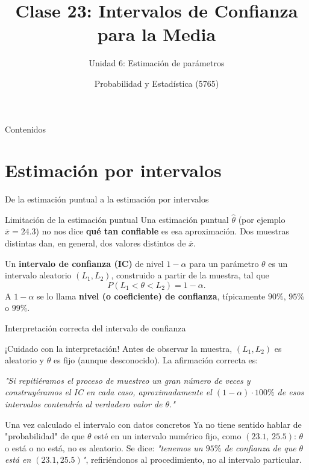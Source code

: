 \documentclass[aspectratio=169,11pt]{beamer}
\title[Prob. y Estadística]{Clase 23: Intervalos de Confianza para la Media}
\subtitle{Unidad 6: Estimación de parámetros}
\institute[UNS]{Universidad Nacional del Sur \\ Departamento de Matemática}
\author{Probabilidad y Estadística (5765)}
\date{}
\begin{document}
\begin{frame}
\titlepage
\end{frame}

\begin{frame}{Contenidos}
\tableofcontents
\end{frame}

\section{Estimación por intervalos}

\begin{frame}{De la estimación puntual a la estimación por intervalos}
\begin{block}{Limitación de la estimación puntual}
Una estimación puntual $\widehat\theta$ (por ejemplo $\overline x = 24.3$) no nos dice \textbf{qué tan confiable} es esa aproximación. Dos muestras distintas dan, en general, dos valores distintos de $\overline x$.
\end{block}

\begin{definition}
Un \textbf{intervalo de confianza (IC)} de nivel $1-\alpha$ para un parámetro $\theta$ es un intervalo aleatorio $(L_1, L_2)$, construido a partir de la muestra, tal que
\[
P(L_1 < \theta < L_2) = 1-\alpha.
\]
A $1-\alpha$ se lo llama \textbf{nivel (o coeficiente) de confianza}, típicamente $90\%$, $95\%$ o $99\%$.
\end{definition}
\end{frame}

\begin{frame}{Interpretación correcta del intervalo de confianza}
\begin{alertblock}{¡Cuidado con la interpretación!}
Antes de observar la muestra, $(L_1,L_2)$ es aleatorio y $\theta$ es fijo (aunque desconocido). La afirmación correcta es:

\emph{"Si repitiéramos el proceso de muestreo un gran número de veces y construyéramos el IC en cada caso, aproximadamente el $(1-\alpha)\cdot 100\%$ de esos intervalos contendría al verdadero valor de $\theta$."}
\end{alertblock}

\begin{block}{Una vez calculado el intervalo con datos concretos}
Ya no tiene sentido hablar de "probabilidad" de que $\theta$ esté en un intervalo numérico fijo, como $(23.1,\,25.5)$: $\theta$ o está o no está, no es aleatorio. Se dice: \emph{"tenemos un $95\%$ de confianza de que $\theta$ está en $(23.1, 25.5)$"}, refiriéndonos al procedimiento, no al intervalo particular.
\end{block}
\end{frame}
\end{document}
